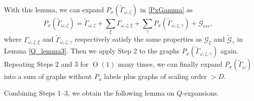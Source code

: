 \documentclass{article}
\newcommand{\1}{\mathds{1}}
\numberwithin{equation}{section}
\renewcommand{\cal}{\mathcal}
\newcommand{\wt}{\widetilde}
\DeclareMathOperator{\OO}{O}
\theoremstyle{plain} %
\theoremstyle{remark}
\begin{document}
With this lemma, we can expand $P_x(\wt \Gamma_{\omega,\zeta}) $ in \eqref{PxGamma} as
$$P_x(\wt \Gamma_{\omega,\zeta}) =\wt \Gamma_{\omega,\zeta}+ \sum_\xi  \Gamma_{\omega,\zeta,\xi} + \sum_\gamma  P_x (\wt \Gamma_{\omega,\zeta,\gamma} ) +\cal G_{err},$$
where $\Gamma_{\omega,\zeta,\xi}$ and $\wt \Gamma_{\omega,\zeta,\gamma} $ respectively satisfy the same properties as 
$ \cal G_{\xi}$ and $\wt{\cal G}_{\gamma} $ in Lemma \ref{Q_lemma3}. Then we apply Step 2 to the graphs $P_x(\wt \Gamma_{\omega,\zeta,\gamma} )$ again. Repeating Steps 2 and 3 for $\OO(1)$ many times, we can finally expand $P_x (\wt \Gamma_{\omega})$ into a sum of graphs without $P_x$ labels plus graphs of scaling order $>D$. 

\medskip
 
Combining Steps 1--3, we obtain the following lemma on $Q$-expansions. 
\end{document}
